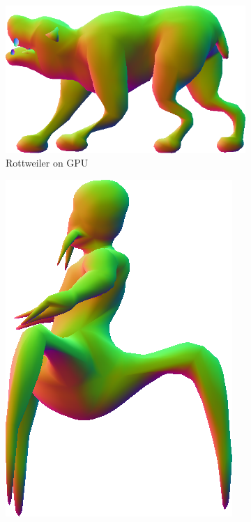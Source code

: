 \begin{figure}
	\begin{subfigure}[b]{0.2\textwidth}
		\centering
		\includegraphics[width=\textwidth]{content/img/results/doggpu.png}
		\caption{Rottweiler on GPU}
		\label{fig:results:cpugpu:gpuDog}
	\end{subfigure}
	\hspace{0.1\textwidth}
	\begin{subfigure}[b]{0.2\textwidth}
		\centering
		\includegraphics[width=\textwidth]{content/img/results/voregpu.png}

\end{subfigure}
\end{figure}
